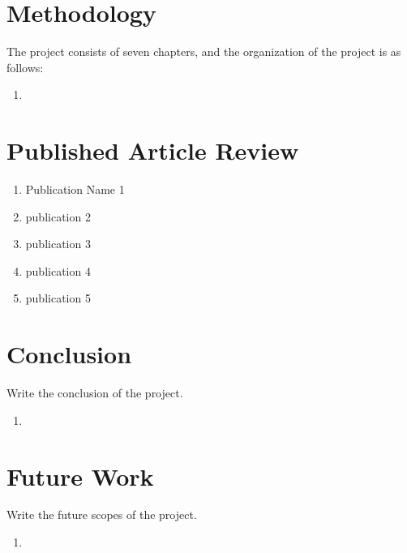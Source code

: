 \documentclass[12pt,a4paper,oneside]{report}
\begin{document}
	\newpage
	\section{Methodology}
	The project consists  of seven  chapters, and the organization of the project is as follows:
	\begin{enumerate}
		\item
		
	\end{enumerate}
	
	\newpage
	\section{Published Article Review}
	\begin{enumerate}
		\item Publication Name 1  
		\item publication 2
		\item publication 3
		\item publication 4
		\item publication 5
		
	\end{enumerate}
	
	\newpage
	\section{Conclusion}
	Write the conclusion of the project.
	\begin{enumerate}
		\item
	\end{enumerate}
	
	\newpage
	\section{Future Work}
	Write the future scopes of the project.
	\begin{enumerate}
		\item
		
	\end{enumerate}
	
	
	
\end{document}
